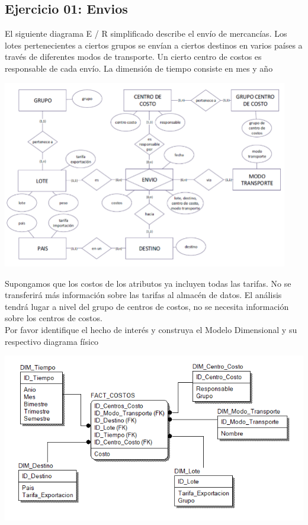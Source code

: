\documentclass[12pt,letterpaper]{article}
\begin{document}
\subsection{Ejercicio 01: Envios}
El siguiente diagrama E / R simplificado describe el envío de mercancías. Los lotes pertenecientes a ciertos grupos se
envían a ciertos destinos en varios países a través de diferentes modos de transporte. Un cierto centro de costos es
responsable de cada envío. La dimensión de tiempo consiste en mes y año
\begin{center}
    \includegraphics[width=12.5cm]{img/ejer1.png}  
\end{center}
Supongamos que los costos de los atributos ya incluyen todas las tarifas. No se transferirá más información sobre las tarifas
al almacén de datos. El análisis tendrá lugar a nivel del grupo de centros de costos, no se necesita información sobre los
centros de costos.
\\Por favor identifique el hecho de interés y construya el Modelo Dimensional y su respectivo diagrama físico
\begin{center}
    \includegraphics[width=15cm]{img/1.png}  
\end{center}
\end{document}
